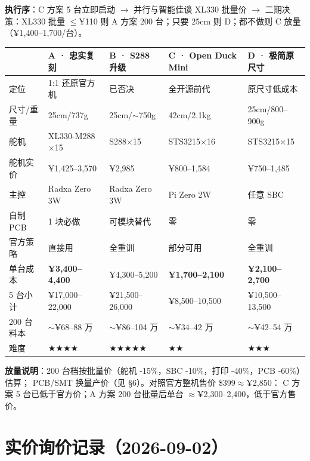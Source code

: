 \documentclass[11pt,a4paper]{ctexart}
\newcommand{\good}[1]{\textcolor{green!55!black}{#1}}
\newcommand{\bad}[1]{\textcolor{red!75!black}{#1}}
\begin{document}
\noindent\textbf{执行序}：C 方案 5 台立即启动 $\to$ 并行与智能佳谈 XL330 批量价 $\to$
二期决策：XL330 批量 $\le$¥110 则 A 方案 200 台；只要 25cm 则 D；都不做则 C 放量（¥1,400--1,700/台）。

\begin{longtable}{L{2.6cm}L{3.4cm}L{3.4cm}L{3.4cm}L{3.2cm}}
\toprule
 & \textbf{A · 忠实复刻} & \textbf{B · S288 升级} & \textbf{C · Open Duck Mini} & \textbf{D · 极简原尺寸} \\
\midrule
定位 & 1:1 还原官方机 & \bad{已否决} & 全开源前代 & 原尺寸低成本 \\
尺寸/重量 & 25cm/737g & 25cm/$\sim$750g & 42cm/2.1kg & 25cm/800--900g \\
舵机 & XL330-M288$\times$15 & S288$\times$15 & STS3215$\times$16 & STS3215$\times$15 \\
舵机实价 & ¥1,425--3,570 & ¥2,985 & ¥800--1,584 & ¥750--1,485 \\
主控 & Radxa Zero 3W & Radxa Zero 3W & Pi Zero 2W & 任意 SBC \\
自制 PCB & 1 块必做 & 可模块替代 & 零 & 零 \\
官方策略 & \good{直接用} & 全重训 & 部分可用 & 全重训 \\
单台成本 & \textbf{¥3,400--4,400} & \bad{¥4,300--5,200} & \textbf{¥1,700--2,100} & \textbf{¥2,100--2,700} \\
5 台小计 & ¥17,000--22,000 & \bad{¥21,500--26,000} & ¥8,500--10,500 & ¥10,500--13,500 \\
200 台料本 & $\sim$¥68--88 万 & \bad{$\sim$¥86--104 万} & $\sim$¥34--42 万 & $\sim$¥42--54 万 \\
难度 & $★★★★$ & $★★★★★$ & $★★$ & $★★★$ \\
\bottomrule
\end{longtable}

\noindent\textbf{放量说明}：200 台档按批量价（舵机 -15\%，SBC -10\%，打印 -40\%，PCB -60\%）估算；
PCB/SMT 换量产价（见 \S6）。对照官方整机售价 \$399$\approx$¥2,850：
\good{C 方案 5 台已低于官方价}；A 方案 200 台批量后单台 $\approx$¥2,300--2,400，低于官方售价。

\section{实价询价记录（2026-09-02）}
\end{document}

